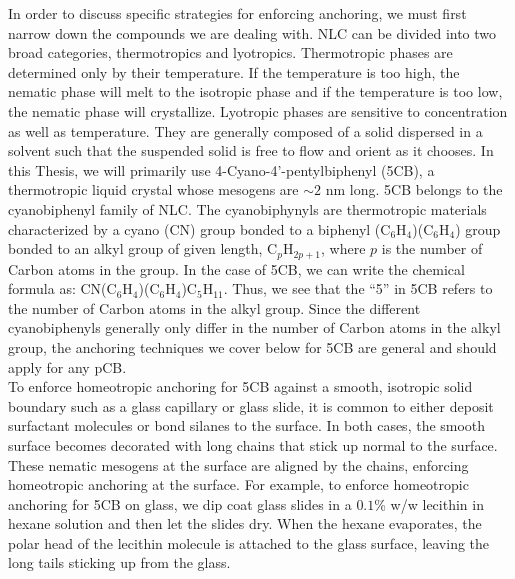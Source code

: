 In order to discuss specific strategies for enforcing anchoring, we must first narrow down the compounds we are dealing with.
NLC can be divided into two broad categories, thermotropics and lyotropics.
Thermotropic phases are determined only by their temperature.
If the temperature is too high, the nematic phase will melt to the isotropic phase and if the temperature is too low, the nematic phase will crystallize.
Lyotropic phases are sensitive to concentration as well as temperature.
They are generally composed of a solid dispersed in a solvent such that the suspended solid is free to flow and orient as it chooses.
In this Thesis, we will primarily use 4-Cyano-4'-pentylbiphenyl (5CB), a thermotropic liquid crystal whose mesogens are $\sim 2$ nm long.\@
5CB belongs to the cyanobiphenyl family of NLC.
The cyanobiphynyls are thermotropic materials characterized by a cyano (CN) group  bonded to a biphenyl (C$_6$H$_4$)(C$_6$H$_4$) group bonded to an alkyl group of given length, C$_p$H$_{2p+1}$, where $p$ is the number of Carbon atoms in the group.
In the case of 5CB, we can write the chemical formula as: CN(C$_6$H$_4$)(C$_6$H$_4$)C$_5$H$_{11}$.
Thus, we see that the ``5'' in 5CB refers to the number of Carbon atoms in the alkyl group.
Since the different cyanobiphenyls generally only differ in the number of Carbon atoms in the alkyl group, the anchoring techniques we cover below for 5CB are general and should apply for any pCB. \\

To enforce homeotropic anchoring for 5CB against a smooth, isotropic solid boundary such as a glass capillary or glass slide, it is common to either deposit surfactant molecules or bond silanes to the surface.
In both cases, the smooth surface becomes decorated with long chains that stick up normal to the surface.
These nematic mesogens at the surface are aligned by the chains, enforcing homeotropic anchoring at the surface.
For example, to enforce homeotropic anchoring for 5CB on glass, we dip coat glass slides in a $0.1$\% w/w lecithin in hexane solution and then let the slides dry.
When the hexane evaporates, the polar head of the lecithin molecule is attached to the glass surface, leaving the long tails sticking up from the glass.\\

